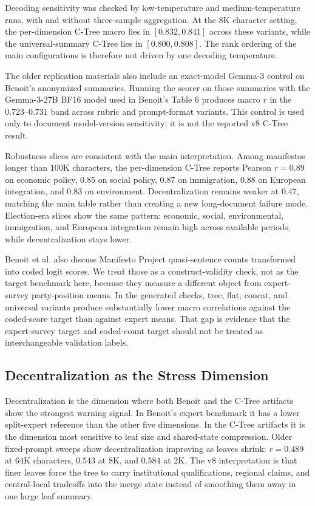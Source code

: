 Decoding sensitivity was checked by low-temperature and medium-temperature
runs, with and without three-sample aggregation. At the \(8\mathrm{K}\)
character setting, the per-dimension C-Tree macro lies in
\([0.832,0.841]\) across these variants, while the universal-summary C-Tree
lies in \([0.800,0.808]\). The rank ordering of the main configurations is
therefore not driven by one decoding temperature.

The older replication materials also include an exact-model Gemma-3 control on
Benoit's anonymized summaries. Running the scorer on those summaries with the
Gemma-3-27B BF16 model used in Benoit's Table 6 produces macro \(r\) in the
\(0.723\)--\(0.731\) band across rubric and prompt-format variants. This
control is used only to document model-version sensitivity; it is not the
reported v8 C-Tree result.

Robustness slices are consistent with the main interpretation. Among
manifestos longer than \(100\mathrm{K}\) characters, the per-dimension C-Tree
reports Pearson \(r=0.89\) on economic policy, \(0.85\) on social policy,
\(0.87\) on immigration, \(0.88\) on European integration, and \(0.83\) on
environment. Decentralization remains weaker at \(0.47\), matching the main
table rather than creating a new long-document failure mode. Election-era
slices show the same pattern: economic, social, environmental, immigration,
and European integration remain high across available periods, while
decentralization stays lower.

Benoit et al. also discuss Manifesto Project quasi-sentence counts transformed
into coded logit scores. We treat those as a construct-validity check, not as
the target benchmark here, because they measure a different object from
expert-survey party-position means. In the generated checks, tree, flat,
concat, and universal variants produce substantially lower macro correlations
against the coded-score target than against expert means. That gap is evidence
that the expert-survey target and coded-count target should not be treated as
interchangeable validation labels.

\subsection{Decentralization as the Stress Dimension}

Decentralization is the dimension where both Benoit and the C-Tree artifacts
show the strongest warning signal. In Benoit's expert benchmark it has a lower
split-expert reference than the other five dimensions. In the C-Tree artifacts
it is the dimension most sensitive to leaf size and shared-state compression.
Older fixed-prompt sweeps show decentralization improving as leaves shrink:
\(r=0.489\) at \(64\mathrm{K}\) characters, \(0.543\) at \(8\mathrm{K}\), and
\(0.584\) at \(2\mathrm{K}\). The v8 interpretation is that finer leaves force
the tree to carry institutional qualifications, regional claims, and
central-local tradeoffs into the merge state instead of smoothing them away in
one large leaf summary.

